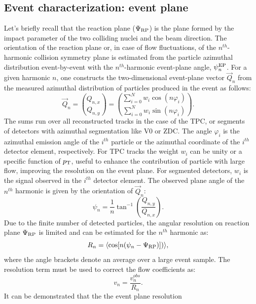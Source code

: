 \subsection{Event characterization: event plane}
\label{sec:EventPlane}
Let's briefly recall that the reaction plane ($\Psi_{\rm RP}$) is the 
plane formed by the impact parameter of the two colliding nuclei and the beam
direction. The orientation of the reaction plane or, in case of flow fluctuations, 
of the $n^{th}$-harmonic collision symmetry plane is estimated 
from the particle azimuthal distribution event-by-event
with the $n^{th}$-harmonic event-plane angle, $\psi_n^{\rm EP}$.
For a given harmonic $n$, one constructs the two-dimensional event-plane 
vector $\vec{Q}_n$ from the measured azimuthal distribution of 
particles produced in the event as follows:
\begin{equation}
\label{f:qvector}
 \vec{Q}_n= {Q_{n,x} \choose Q_{n,y}} = {\sum_{i=0}^{N} w_i \cos (n\varphi_i) \choose \sum_{i=0}^{N} w_i \sin (n\varphi_i)}.
\end{equation}
The sums run over all reconstructed tracks in the case 
of the TPC, or segments of detectors with azimuthal 
segmentation like V0 or ZDC. The angle $\varphi_i$ is 
the azimuthal emission angle of the $i^{th}$ particle or the 
azimuthal coordinate of the $i^{th}$ detector element, respectively. 
For TPC tracks the weight $w_i$ can be unity or a specific 
function of $p_{\rm T}$, useful to enhance the 
contribution of particle with large flow, improving 
the resolution on the event plane. For segmented detectors, $w_i$ is the 
signal observed in the $i^{th}$ detector element. The observed plane 
angle of the $n^{th}$ harmonic is given by the orientation of $\vec{Q}_n$:
\begin{equation}
\psi_n = \dfrac{1}{n} \tan^{-1} \left(\dfrac{Q_{n,y}}{Q_{n,x}}\right).
\end{equation}
Due to the finite number of detected particles, the
angular resolution on reaction plane $\Psi_{\rm RP}$ is limited and 
can be estimated for the $n^{th}$ harmonic as:
\begin{equation}
R_n = \langle {\rm cos}[n({\rm \psi}_n-{\rm \Psi}_{\rm RP})]) \rangle ,
\end{equation}
where the angle brackets denote an average over a large event sample.
The resolution term must be used to correct the flow coefficients as:
\begin{equation}
v_n = \frac{v_n^{obs}}{R_n}.
\end{equation}
It can be demonstrated that the the event plane resolution 
